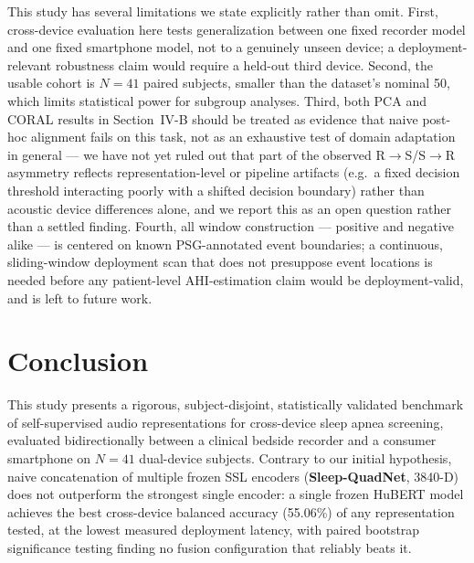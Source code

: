 \documentclass[conference]{IEEEtran}
\begin{document}
This study has several limitations we state explicitly rather than omit. First, cross-device evaluation here tests generalization between one fixed recorder model and one fixed smartphone model, not to a genuinely unseen device; a deployment-relevant robustness claim would require a held-out third device. Second, the usable cohort is $N=41$ paired subjects, smaller than the dataset's nominal 50, which limits statistical power for subgroup analyses. Third, both PCA and CORAL results in Section~IV-B should be treated as evidence that naive post-hoc alignment fails on this task, not as an exhaustive test of domain adaptation in general --- we have not yet ruled out that part of the observed R$\rightarrow$S/S$\rightarrow$R asymmetry reflects representation-level or pipeline artifacts (e.g.\ a fixed decision threshold interacting poorly with a shifted decision boundary) rather than acoustic device differences alone, and we report this as an open question rather than a settled finding. Fourth, all window construction --- positive and negative alike --- is centered on known PSG-annotated event boundaries; a continuous, sliding-window deployment scan that does not presuppose event locations is needed before any patient-level AHI-estimation claim would be deployment-valid, and is left to future work.

\section{Conclusion}

This study presents a rigorous, subject-disjoint, statistically validated benchmark of self-supervised audio representations for cross-device sleep apnea screening, evaluated bidirectionally between a clinical bedside recorder and a consumer smartphone on $N=41$ dual-device subjects. Contrary to our initial hypothesis, naive concatenation of multiple frozen SSL encoders (\textbf{Sleep-QuadNet}, 3840-D) does not outperform the strongest single encoder: a single frozen HuBERT model achieves the best cross-device balanced accuracy (55.06\%) of any representation tested, at the lowest measured deployment latency, with paired bootstrap significance testing finding no fusion configuration that reliably beats it.
\end{document}
